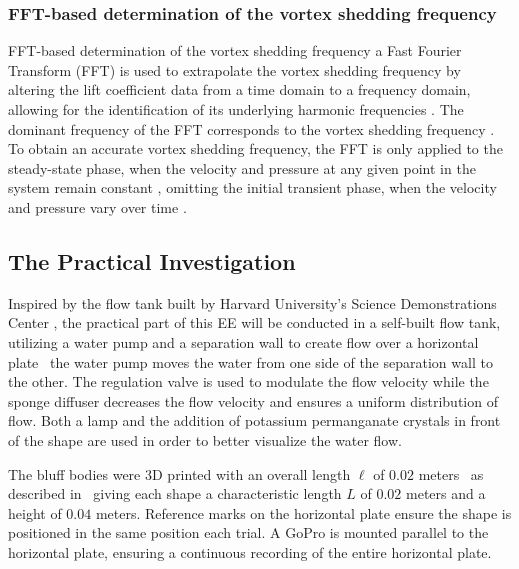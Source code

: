 \subsubsection{FFT-based determination of the vortex shedding frequency}
FFT-based determination of the vortex shedding frequency a Fast Fourier Transform (FFT) is used to extrapolate the vortex shedding frequency by altering the lift coefficient data from a time domain to a frequency domain, allowing for the identification of its underlying harmonic frequencies \parencite[10--11]{shi2025vortex}. The dominant frequency of the FFT corresponds to the vortex shedding frequency \parencite[12]{xu_experimental_2025}. To obtain an accurate vortex shedding frequency, the FFT is only applied to the steady-state phase, when the velocity and pressure at any given point in the system remain constant \parencite{noauthor_steady_nodate}, omitting the initial transient phase, when the velocity and pressure vary over time \parencite{noauthor_transient_nodate}. 

\subsection{The Practical Investigation}
Inspired by the flow tank built by Harvard University’s Science Demonstrations Center \parencite{noauthor_vortex_nodate}, the practical part of this EE will be conducted in a self-built flow tank, utilizing a water pump and a separation wall to create flow over a horizontal plate \textemdash\ the water pump moves the water from one side of the separation wall to the other. The regulation valve is used to modulate the flow velocity while the sponge diffuser decreases the flow velocity and ensures a uniform distribution of flow. Both a lamp and the addition of potassium permanganate crystals in front of the shape are used in order to better visualize the water flow. 

The bluff bodies were 3D printed with an overall length $\ell$ of $0.02$ meters \textemdash\ as described in  \textemdash\ giving each shape a characteristic length $L$ of $0.02$ meters and a height of $0.04$ meters. Reference marks on the horizontal plate ensure the shape is positioned in the same position each trial. A GoPro is mounted parallel to the horizontal plate, ensuring a continuous recording of the entire horizontal plate.
 

